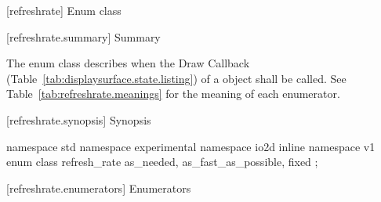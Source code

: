  [refreshrate] {Enum class }

 [refreshrate.summary] { Summary}

\pnum
The  enum class describes when the Draw Callback (Table~\ref{tab:displaysurface.state.listing}) of a  object shall be called. See Table~\ref{tab:refreshrate.meanings} for the meaning of each \tcode{} enumerator.

 [refreshrate.synopsis] { Synopsis}

\begin{codeblock}
namespace std { namespace experimental { namespace io2d { inline namespace v1 {
  enum class refresh_rate {
    as_needed,
    as_fast_as_possible,
    fixed
  };
} } } }
\end{codeblock}

 [refreshrate.enumerators] { Enumerators}


